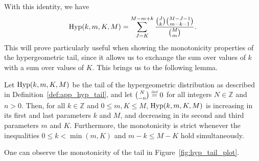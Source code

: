 \documentclass[twoside,11pt]{article}
\newcommand{\eqdef}{\overset{\smash{\mbox{\tiny \rm def}}}{=}}
\newcommand{\Hyp}{\textnormal{Hyp}}
\begin{document}
With this identity, we have 
\begin{equation*}
    \Hyp(k,m,K,M) = \sum_{J=K}^{M-m+k}\frac{\binom{J}{k} \binom{M-J-1}{m-k-1}}{\binom{M}{m}}.
\end{equation*}
This will prove particularly useful when showing the monotonicity properties of the hypergeometric tail, since it allows us to exchange the sum over values of $k$ with a sum over values of $K$.
This brings us to the following lemma.


\begin{lemma}
\label{lem:monotonicity_hyp_tail}
Let $\Hyp(k,m,K,M)$ be the tail of the hypergeometric distribution as described in Definition~\ref{def:app_hyp_tail}, and let $\binom{N}{-n} \eqdef 0$ for all integers $N \in \mathds{Z}$ and $n > 0$.
Then, for all $k \in \mathds{Z}$ and $0 \le m,K \le M$, $\Hyp(k,m,K,M)$ is increasing in its first and last parameters $k$ and $M$, and decreasing in its second and third parameters $m$ and $K$.
Furthermore, the monotonicity is strict whenever the inequalities $0 \le k < \min(m,K)$ and $m-k \le M-K$ hold simultaneously.
\end{lemma}

One can observe the monotonicity of the tail in Figure~\ref{fig:hyp_tail_plot}.
\end{document}

